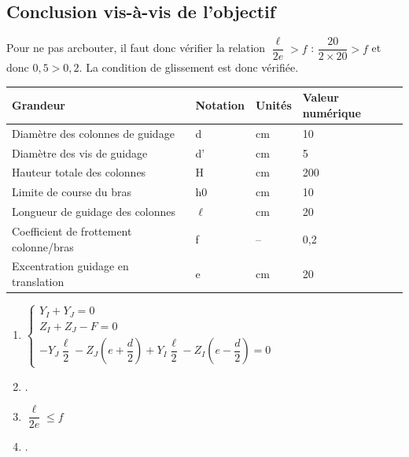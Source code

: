 \subsection*{Conclusion vis-à-vis de l'objectif}
\ifprof
\begin{corrige}
Pour ne pas arcbouter, il faut donc vérifier la relation $\dfrac{\ell}{2e} > f $ : $\dfrac{20}{2\times 20} > f $ et donc $0,5>0,2$.  La condition de glissement est donc vérifiée. 
\end{corrige}
\else
\fi



\ifprof
\else

\footnotesize
\noindent\begin{center}
\begin{tabular}{llll}
\hline
Grandeur & Notation & Unités & Valeur numérique \\ \hline
Diamètre des colonnes  de guidage & d & cm & 10 \\ 
Diamètre des vis de guidage & d' & cm & 5 \\ 
Hauteur totale des colonnes & H & cm & 200 \\ 
Limite de course du bras & h0 & cm & 10 \\ 
Longueur de guidage des colonnes & $\ell$  & cm & 20 \\ 
Coefficient de frottement colonne/bras & f & -- & 0,2 \\ 
Excentration guidage en translation & e & cm & 20 \\ \hline
\end{tabular}
\end{center}

\normalsize
\fi


\ifprof
\else
\ifcolle
\else
\begin{solution}
\begin{enumerate}
\item $\left\{
\begin{array}{l}
Y_I + Y_J = 0 \\
Z_I + Z_J -F = 0 \\ 
-Y_J \dfrac{\ell}{2}-Z_J \left(e+\dfrac{d}{2}\right) 
+Y_I \dfrac{\ell}{2}-Z_I \left(e-\dfrac{d}{2}\right) = 0
\end{array}
\right.$
\item .
\item $\dfrac{\ell}{2e} \leq f $
\item .
\end{enumerate} 
\end{solution}
\fi
\fi


